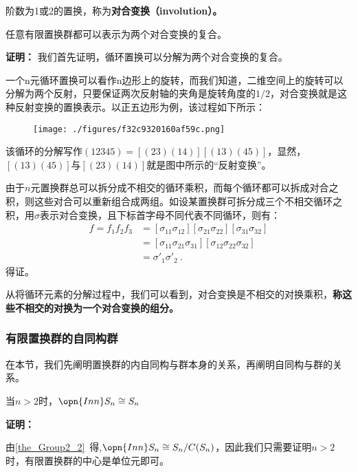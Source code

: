 
\begin{definition}{}
阶数为1或2的置换，称为\textbf{对合变换（involution）。}
\end{definition}
\begin{theorem}{}
任意有限置换群都可以表示为两个对合变换的复合。
\end{theorem}
\textbf{证明：}
我们首先证明，循环置换可以分解为两个对合变换的复合。

一个n元循环置换可以看作n边形上的旋转，而我们知道，二维空间上的旋转可以分解为两个反射，只要保证两次反射轴的夹角是旋转角度的$1/2$，对合变换就是这种反射变换的置换表示。以正五边形为例，该过程如下所示：
\begin{figure}[ht]
\centering
\texttt{[image: ./figures/f32c9320160af59c.png]}
\caption{} \label{fig_AutSym_2}
\end{figure}
该循环的分解写作$(12345)=[(23)(14)][(13)(45)]$，显然，$[(13)(45)]$与$[(23)(14)]$就是图中所示的“反射变换”。

由于$n$元置换群总可以拆分成不相交的循环乘积，而每个循环都可以拆成对合之积，则这些对合可以重新组合成两组。如设某置换群可拆分成三个不相交循环之积，用$\sigma$表示对合变换，且下标首字母不同代表不同循环，则有：
\begin{equation}
\begin{aligned}
f=f_1f_2f_3&=[\sigma_{11}\sigma_{12}][\sigma_{21}\sigma_{22}][\sigma_{31}\sigma_{32}]\\
&=[\sigma_{11}\sigma_{21}\sigma_{31}][\sigma_{12}\sigma_{22}\sigma_{32}]\\
&=\sigma'_1\sigma'_2~.
\end{aligned}
\end{equation}
得证。

从将循环元素的分解过程中，我们可以看到，对合变换是不相交的对换乘积，\textbf{称这些不相交的对换为一个对合变换的组分。}
\subsubsection{有限置换群的自同构群}
在本节，我们先阐明置换群的内自同构与群本身的关系，再阐明自同构与群的关系。
\begin{theorem}{}
当$n>2$时，$\opn{Inn}S_n\cong S_n$
\end{theorem}

\textbf{证明：}

由\autoref{the_Group2_2}~得,$\opn{Inn}S_n\cong S_n/C(S_n)$，因此我们只需要证明$n>2$时，有限置换群的中心是单位元即可。

